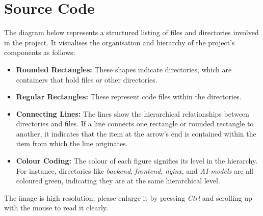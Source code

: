 \chapter{Source Code}

The diagram below represents a structured listing of files and directories involved in the project. It visualises the organisation and hierarchy of the project's components as follows:
\begin{itemize}
    \item \textbf{Rounded Rectangles:} These shapes indicate directories, which are containers that hold files or other directories.
    \item \textbf{Regular Rectangles:} These represent code files within the directories.
    \item \textbf{Connecting Lines:} The lines show the hierarchical relationships between directories and files. If a line connects one rectangle or rounded rectangle to another, it indicates that the item at the arrow's end is contained within the item from which the line originates.
    \item \textbf{Colour Coding:} The colour of each figure signifies its level in the hierarchy. For instance, directories like \textit{backend}, \textit{frontend}, \textit{nginx}, and \textit{AI-models} are all coloured green, indicating they are at the same hierarchical level.
\end{itemize}

The image is high resolution; please enlarge it by pressing \textit{Ctrl} and scrolling up with the mouse to read it clearly.

